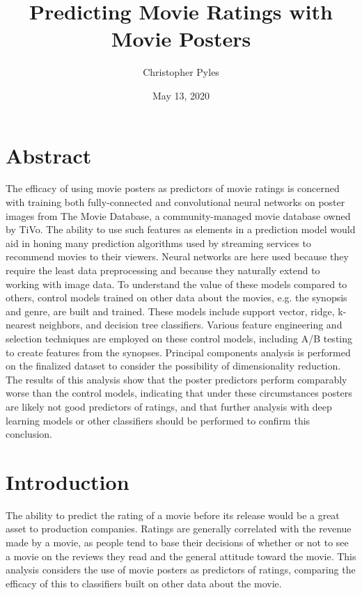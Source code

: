 \documentclass[12pt, oneside]{article}   	%
\title{%
	Predicting Movie Ratings with Movie Posters}
\author{Christopher Pyles}
\date{May 13, 2020}							%
\begin{document}
\maketitle

\section*{Abstract}

The efficacy of using movie posters as predictors of movie ratings is concerned with training both fully-connected and convolutional neural networks on poster images from The Movie Database, a community-managed movie database owned by TiVo. The ability to use such features as elements in a prediction model would aid in honing many prediction algorithms used by streaming services to recommend movies to their viewers. Neural networks are here used because they require the least data preprocessing and because they naturally extend to working with image data. To understand the value of these models compared to others, control models trained on other data about the movies, e.g. the synopsis and genre, are built and trained. These models include support vector, ridge, k-nearest neighbors, and decision tree classifiers. Various feature engineering and selection techniques are employed on these control models, including A/B testing to create features from the synopses. Principal components analysis is performed on the finalized dataset to consider the possibility of dimensionality reduction. The results of this analysis show that the poster predictors perform comparably worse than the control models, indicating that under these circumstances posters are likely not good predictors of ratings, and that further analysis with deep learning models or other classifiers should be performed to confirm this conclusion.

\newpage

\tableofcontents

\newpage

\section{Introduction}

The ability to predict the rating of a movie before its release would be a great asset to production companies. Ratings are generally correlated with the revenue made by a movie, as people tend to base their decisions of whether or not to see a movie on the reviews they read and the general attitude toward the movie. This analysis considers the use of movie posters as predictors of ratings, comparing the efficacy of this to classifiers built on other data about the movie.
\end{document}
